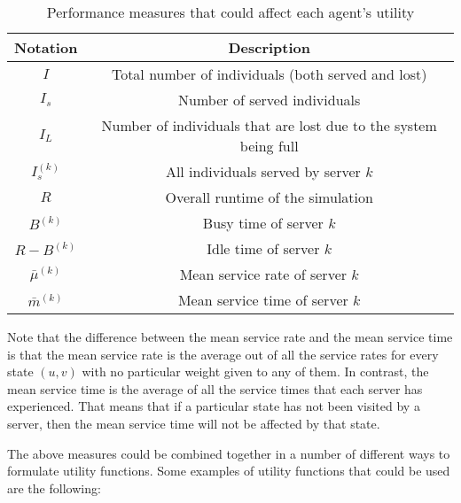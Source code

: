 \begin{table}[htbp]
    \centering
    \caption{Performance measures that could affect each agent's utility}
    \label{tab:server_agents_performance_measures}
    \begin{tabular}{|c|c|}
        \hline
        \textbf{Notation} & \textbf{Description} \\
        \hline
        \hline
        \(I\) & Total number of individuals (both served and lost) \\
        \hline
        \(I_s\) & Number of served individuals \\
        \hline
        \(I_L\) & Number of individuals that are lost due to the system being
        full \\
        \hline
        \(I_s^{(k)}\) & All individuals served by server \(k\) \\
        \hline
        \(R\) & Overall runtime of the simulation \\
        \hline
        \(B^{(k)}\) & Busy time of server \(k\) \\
        \hline
        \(R - B^{(k)}\) & Idle time of server \(k\) \\
        \hline
        \(\bar{\mu}^{(k)}\) & Mean service rate of server \(k\) \\
        \hline
        \(\bar{m}^{(k)}\) & Mean service time of server \(k\) \\
        \hline
    \end{tabular}
\end{table}

Note that the difference between the mean service rate and the mean service
time is that the mean service rate is the average out of all the service rates
for every state \((u, v)\) with no particular weight given to any of them.
In contrast, the mean service time is the average of all the service times
that each server has experienced.
That means that if a particular state has not been visited by a server, then
the mean service time will not be affected by that state.

The above measures could be combined together in a number of different ways to
formulate utility functions.
Some examples of utility functions that could be used are the following:

